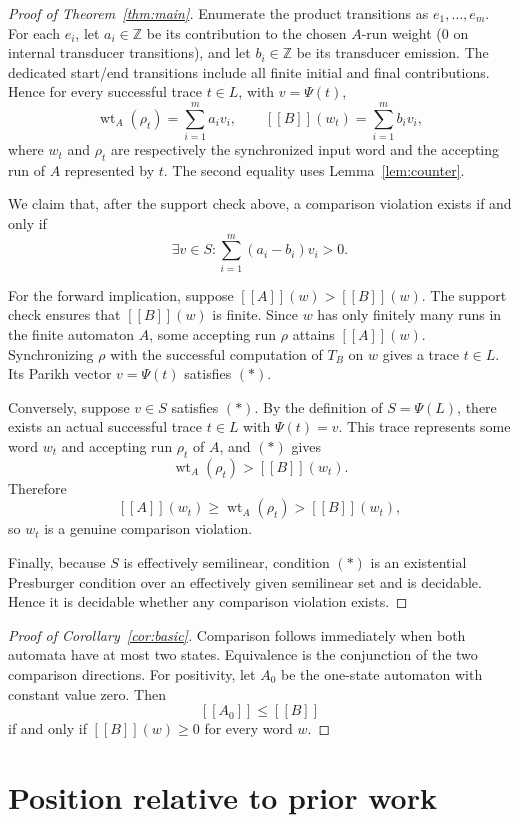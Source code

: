 \documentclass[11pt]{article}
\newcommand{\eval}[1]{[\![#1]\!]}
\begin{document}
\begin{proof}[Proof of Theorem~\ref{thm:main}]
Enumerate the product transitions as $e_1,\ldots,e_m$. For each $e_i$, let $a_i\in\mathbb Z$ be its contribution to the chosen $A$-run weight ($0$ on internal transducer transitions), and let $b_i\in\mathbb Z$ be its transducer emission. The dedicated start/end transitions include all finite initial and final contributions. Hence for every successful trace $t\in L$, with $v=\Psi(t)$,
\[
  \operatorname{wt}_A(\rho_t)=\sum_{i=1}^m a_i v_i,
  \qquad
  \eval{B}(w_t)=\sum_{i=1}^m b_i v_i,
\]
where $w_t$ and $\rho_t$ are respectively the synchronized input word and the accepting run of $A$ represented by $t$. The second equality uses Lemma~\ref{lem:counter}.

We claim that, after the support check above, a comparison violation exists if and only if
\[
  \exists v\in S:
  \sum_{i=1}^m (a_i-b_i)v_i>0. \tag{*}
\]

For the forward implication, suppose $\eval{A}(w)>\eval{B}(w)$. The support check ensures that $\eval{B}(w)$ is finite. Since $w$ has only finitely many runs in the finite automaton $A$, some accepting run $\rho$ attains $\eval{A}(w)$. Synchronizing $\rho$ with the successful computation of $T_B$ on $w$ gives a trace $t\in L$. Its Parikh vector $v=\Psi(t)$ satisfies $(*)$.

Conversely, suppose $v\in S$ satisfies $(*)$. By the definition of $S=\Psi(L)$, there exists an actual successful trace $t\in L$ with $\Psi(t)=v$. This trace represents some word $w_t$ and accepting run $\rho_t$ of $A$, and $(*)$ gives
\[
  \operatorname{wt}_A(\rho_t)>\eval{B}(w_t).
\]
Therefore
\[
  \eval{A}(w_t)\ge \operatorname{wt}_A(\rho_t)>\eval{B}(w_t),
\]
so $w_t$ is a genuine comparison violation.

Finally, because $S$ is effectively semilinear, condition $(*)$ is an existential Presburger condition over an effectively given semilinear set and is decidable. Hence it is decidable whether any comparison violation exists.
\end{proof}

\begin{proof}[Proof of Corollary~\ref{cor:basic}]
Comparison follows immediately when both automata have at most two states. Equivalence is the conjunction of the two comparison directions. For positivity, let $A_0$ be the one-state automaton with constant value zero. Then
\[
\eval{A_0}\leq\eval{B}
\]
if and only if $\eval{B}(w)\geq0$ for every word $w$.
\end{proof}

\section{Position relative to prior work}
\end{document}
